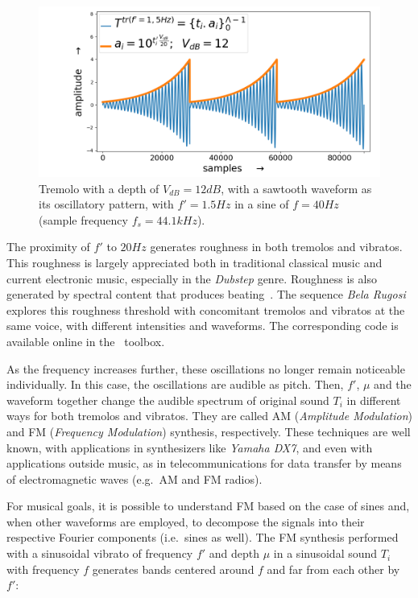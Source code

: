\begin{figure}
     \centering
         \includegraphics[width=\textwidth]{figures/tremolo_}
     \caption{Tremolo with a depth of $V_{dB}=12dB$, with a sawtooth waveform as its oscillatory pattern, with $f'=1.5Hz$ in a sine of $f=40Hz$ (sample frequency $f_s=44.1kHz$).}
         \label{fig:tremolo}
\end{figure}

The proximity of $f'$ to $20Hz$ generates roughness in both tremolos and vibratos. This roughness is largely appreciated both in traditional classical music and current electronic music, especially in the \emph{Dubstep} genre. Roughness is also generated by spectral content that produces beating~\cite{Porres,porres2009}. The sequence \emph{Bela Rugosi} explores this roughness threshold with concomitant tremolos and vibratos at the same voice, with different intensities and waveforms. The corresponding code is available online in the \massa\ toolbox.

As the frequency increases further, these oscillations no longer remain noticeable individually. In this case, the oscillations are audible as pitch. Then, $f'$, $\mu$ and the waveform together change the audible spectrum of original sound $T_i$ in different ways for both tremolos and vibratos. They are called AM (\emph{Amplitude Modulation}) and FM (\emph{Frequency Modulation}) synthesis,
respectively. These techniques are well known, with applications in
synthesizers like \emph{Yamaha DX7}, and even with applications outside music, as in telecommunications for data transfer by means of electromagnetic waves (e.g.\ AM and FM radios).

For musical goals, it is possible to understand FM based on the
case of sines and, when other waveforms are employed, to decompose the signals into their respective Fourier components (i.e.\ sines as well). The FM synthesis performed with a sinusoidal vibrato of frequency $f'$ and depth $\mu$ in a sinusoidal sound $T_i$ with frequency $f$ generates bands centered around $f$ and far from each other by $f'$:

